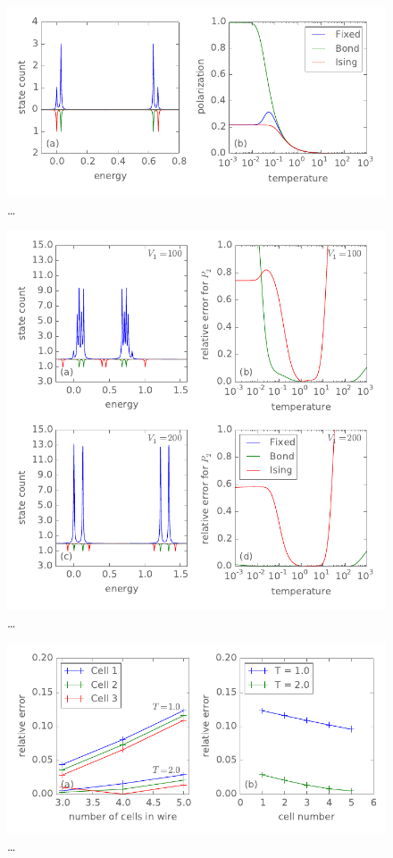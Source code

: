 %
\begin{figure}
  \center
  \includegraphics{ising_approximation1}
  \caption{\ldots}
  \label{fig:ising_approximation1}
\end{figure}
%
%
\begin{figure}
  \center
  \includegraphics{ising_approximation2}
  \caption{\ldots}
  \label{fig:ising_approximation2}
\end{figure}
%
%
\begin{figure}
  \center
  \includegraphics{ising_approximation3}
  \caption{\ldots}
  \label{fig:ising_approximation3}
\end{figure}
%


